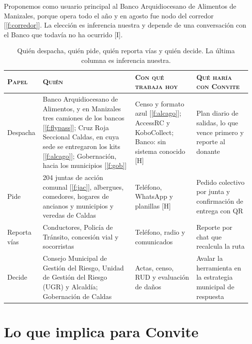 \documentclass[11pt,letterpaper,parskip=half-]{scrartcl}
\newcommand{\marca}[1]{\textcolor{ceniza}{\footnotesize[#1]}}   %
\newcommand{\cf}[1]{\textcolor{tinta}{[\ref{#1}]}}                %
\begin{document}
Proponemos como usuario principal al Banco Arquidiocesano de Alimentos de Manizales, porque opera todo el año y en agosto fue nodo del corredor \cf{f:corredor}. La elección es inferencia nuestra y depende de una conversación con el Banco que todavía no ha ocurrido \marca{I}.

\begin{table}[ht]
\small
\renewcommand{\arraystretch}{1.18}
\caption{Quién despacha, quién pide, quién reporta vías y quién decide. La última columna es inferencia nuestra.}
\label{tab:actores}
\begin{tabularx}{\linewidth}{@{}L{1.9cm} Y L{3.3cm} L{3.7cm}@{}}
\toprule
\textsc{Papel} & \textsc{Quién} & \textsc{Con qué trabaja hoy} & \textsc{Qué haría con Convite}\\
\midrule
Despacha & Banco Arquidiocesano de Alimentos, y en Manizales tres camiones de los bancos \cf{f:flypass}; Cruz Roja Seccional Caldas, en cuya sede se entregaron los kits \cf{f:alcago}; Gobernación, hacia los municipios \cf{f:gob} & Censo y formato azul \cf{f:alcago}; AccessRC y KoboCollect; Banco: sin sistema conocido \marca{H} & Plan diario de salidas, lo que vence primero y reporte al donante\\
Pide & 204 juntas de acción comunal \cf{f:jac}, albergues, comedores, hogares de ancianos y municipios y veredas de Caldas & Teléfono, WhatsApp y planillas \marca{H} & Pedido colectivo por junta y confirmación de entrega con QR\\
Reporta vías & Conductores, Policía de Tránsito, concesión vial y socorristas & Teléfono, radio y comunicados & Reporte por chat que recalcula la ruta\\
Decide & Consejo Municipal de Gestión del Riesgo, Unidad de Gestión del Riesgo (UGR) y Alcaldía; Gobernación de Caldas & Actas, censo, RUD y evaluación de daños & Avalar la herramienta en la estrategia municipal de respuesta\\
\bottomrule
\end{tabularx}
\end{table}

\section{Lo que implica para Convite}
\end{document}
